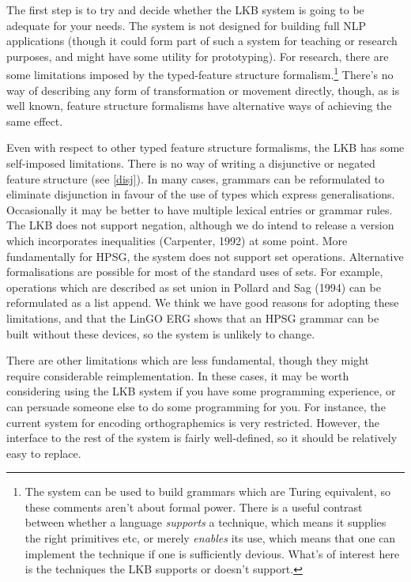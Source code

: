 \documentclass[12pt]{report}
\begin{document}
The first step is to try and decide whether the LKB system is
going to be adequate for your needs.  The system is not designed for
building full NLP applications (though it could form part of such a 
system for teaching or research purposes, and might have some
utility for prototyping).  
For research, there are some
limitations imposed by the typed-feature structure 
formalism.\footnote{The system can be used to 
build grammars which are Turing equivalent, so 
these comments aren't about formal power.  There is a useful contrast
between whether a language {\it supports} a technique, which means it
supplies the right primitives etc, or merely {\it enables} its use,
which means that one can implement the technique if one is sufficiently
devious.  What's of interest here is the techniques the LKB
supports or doesn't support.}
There's no way of describing any form of transformation
or movement directly, though, as is well known, feature structure
formalisms have alternative ways of achieving the same effect.

Even with respect to other typed feature structure formalisms,
the LKB has some self-imposed limitations.  There is
no way of writing a disjunctive or negated
feature structure (see \ref{disj}).
In many cases, grammars can be reformulated to eliminate disjunction
in favour of the use of types which express generalisations.
Occasionally it may be better to have multiple lexical entries
or grammar rules.  
The LKB does not support negation,
although we do
intend to release a version which incorporates inequalities
(Carpenter, 1992) at some point.  More fundamentally for HPSG, the system
does not support set operations.  Alternative formalisations are
possible for most of the standard uses of sets.  For example,
operations which are described as set union in Pollard and Sag (1994)
can be reformulated as a list append.  We think we have good reasons
for adopting these limitations, and that the LinGO ERG
shows that an HPSG grammar can be built without these devices,
so the system is unlikely to change.

There are other limitations which are less fundamental,
though they might require considerable reimplementation.
In these cases, it may be worth considering using the LKB system if
you have some programming experience, or can persuade
someone else to do some programming for you.  For instance,
the current system for encoding orthographemics is very restricted.  
However, the interface to the rest of the system is fairly well-defined,
so it should be relatively easy to replace.  
\end{document}
